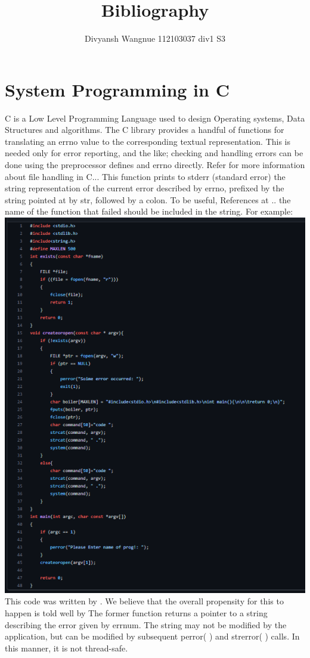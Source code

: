 \documentclass[10pt,a4paper]{report}
\author{Divyansh Wangnue 112103037 div1 S3}
\title{Bibliography}
\begin{document}
\maketitle


\section{System Programming in C}

C is a Low Level Programming Language used to design Operating systems, Data Structures and algorithms. The C library provides a handful of functions for translating an errno value to the
corresponding textual representation. This is needed only for error reporting, and the like;
checking and handling errors can be done using the preprocessor defines and errno directly.
Refer \cite{gfg} for more information about file handling in C...
This function prints to stderr (standard error) the string representation of the current error
described by errno, prefixed by the string pointed at by str, followed by a colon. To be useful,
References at  \cite{C}..
the name of the function that failed should be included in the string. For example:\\


\includegraphics[scale=1]{"OurCommandLineUtil.png"}
\\ [8pt]
This code  was written by \cite{atharva}. We believe that the overall propensity for this to happen is told well by \cite{somesite}
The former function returns a pointer to a string describing the error given by errnum. The
string may not be modified by the application, but can be modified by subsequent perror( )
and strerror( ) calls. In this manner, it is not thread-safe.
\end{document}
